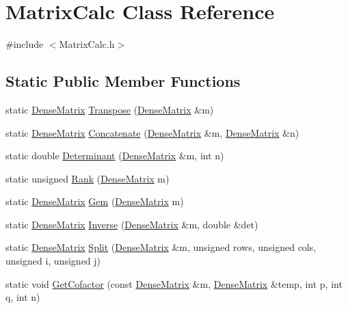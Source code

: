\hypertarget{class_matrix_calc}{}\section{Matrix\+Calc Class Reference}
\label{class_matrix_calc}


{\ttfamily \#include $<$Matrix\+Calc.\+h$>$}

\subsection*{Static Public Member Functions}
\begin{DoxyCompactItemize}
\item 
static \mbox{\hyperlink{class_dense_matrix}{Dense\+Matrix}} \mbox{\hyperlink{class_matrix_calc_a8c8922e853ec86d5c65f45daae848b36}{Transpose}} (\mbox{\hyperlink{class_dense_matrix}{Dense\+Matrix}} \&m)
\item 
static \mbox{\hyperlink{class_dense_matrix}{Dense\+Matrix}} \mbox{\hyperlink{class_matrix_calc_aea2db410b22f84eb9a8a8622c79c8fb2}{Concatenate}} (\mbox{\hyperlink{class_dense_matrix}{Dense\+Matrix}} \&m, \mbox{\hyperlink{class_dense_matrix}{Dense\+Matrix}} \&n)
\item 
static double \mbox{\hyperlink{class_matrix_calc_a636734e5530c834930b4d3c6ada60a64}{Determinant}} (\mbox{\hyperlink{class_dense_matrix}{Dense\+Matrix}} \&m, int n)
\item 
static unsigned \mbox{\hyperlink{class_matrix_calc_a93e228bda2d54136eed936993511212b}{Rank}} (\mbox{\hyperlink{class_dense_matrix}{Dense\+Matrix}} m)
\item 
static \mbox{\hyperlink{class_dense_matrix}{Dense\+Matrix}} \mbox{\hyperlink{class_matrix_calc_aa108503e6b7e8afc32ce14a6e891a364}{Gem}} (\mbox{\hyperlink{class_dense_matrix}{Dense\+Matrix}} m)
\item 
static \mbox{\hyperlink{class_dense_matrix}{Dense\+Matrix}} \mbox{\hyperlink{class_matrix_calc_a097f01e15bec746e73d4a90308f08564}{Inverse}} (\mbox{\hyperlink{class_dense_matrix}{Dense\+Matrix}} \&m, double \&det)
\item 
static \mbox{\hyperlink{class_dense_matrix}{Dense\+Matrix}} \mbox{\hyperlink{class_matrix_calc_a498076c4699b1e664c90ba83a28231e5}{Split}} (\mbox{\hyperlink{class_dense_matrix}{Dense\+Matrix}} \&m, unsigned rows, unsigned cols, unsigned i, unsigned j)
\item 
static void \mbox{\hyperlink{class_matrix_calc_a0509681d75bacece9a9254e84c915dcd}{Get\+Cofactor}} (const \mbox{\hyperlink{class_dense_matrix}{Dense\+Matrix}} \&m, \mbox{\hyperlink{class_dense_matrix}{Dense\+Matrix}} \&temp, int p, int q, int n)

\end{DoxyCompactItemize}
